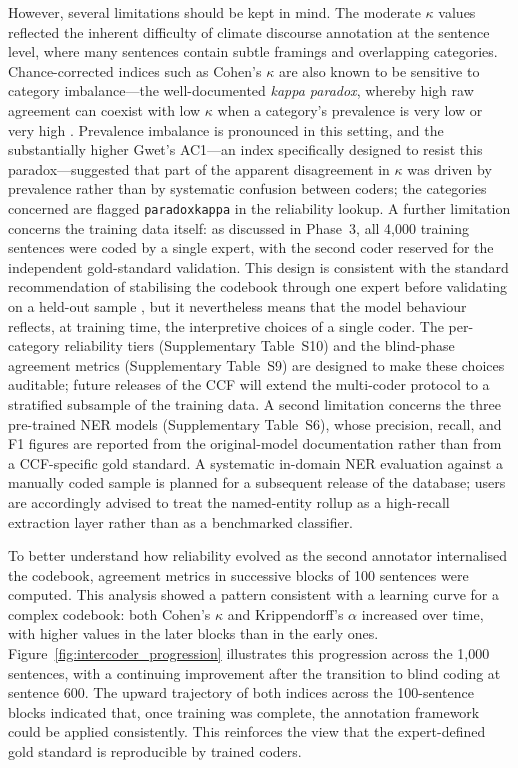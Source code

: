 \documentclass[12pt]{article}
\renewcommand\_{\texttt{\detokenize{_}\allowbreak}}
\begin{document}
However, several limitations should be kept in mind. The moderate $\kappa$ values reflected the inherent difficulty of climate discourse annotation at the sentence level, where many sentences contain subtle framings and overlapping categories. Chance-corrected indices such as Cohen's $\kappa$ are also known to be sensitive to category imbalance---the well-documented \emph{kappa paradox}, whereby high raw agreement can coexist with low $\kappa$ when a category's prevalence is very low or very high \autocite{feinstein_high_1990, byrt_bias_1993}. Prevalence imbalance is pronounced in this setting, and the substantially higher Gwet's AC1---an index specifically designed to resist this paradox---suggested that part of the apparent disagreement in $\kappa$ was driven by prevalence rather than by systematic confusion between coders; the categories concerned are flagged \texttt{paradox\_kappa} in the reliability lookup. A further limitation concerns the training data itself: as discussed in Phase~3, all 4,000 training sentences were coded by a single expert, with the second coder reserved for the independent gold-standard validation. This design is consistent with the standard recommendation of stabilising the codebook through one expert before validating on a held-out sample \autocite{krippendorff_content_2019}, but it nevertheless means that the model behaviour reflects, at training time, the interpretive choices of a single coder. The per-category reliability tiers (Supplementary Table~S10) and the blind-phase agreement metrics (Supplementary Table~S9) are designed to make these choices auditable; future releases of the CCF will extend the multi-coder protocol to a stratified subsample of the training data. A second limitation concerns the three pre-trained NER models (Supplementary Table~S6), whose precision, recall, and F1 figures are reported from the original-model documentation rather than from a CCF-specific gold standard. A systematic in-domain NER evaluation against a manually coded sample is planned for a subsequent release of the database; users are accordingly advised to treat the named-entity rollup as a high-recall extraction layer rather than as a benchmarked classifier.

To better understand how reliability evolved as the second annotator internalised the codebook, agreement metrics in successive blocks of 100 sentences were computed. This analysis showed a pattern consistent with a learning curve for a complex codebook: both Cohen's $\kappa$ and Krippendorff's $\alpha$ increased over time, with higher values in the later blocks than in the early ones. Figure~\ref{fig:intercoder_progression} illustrates this progression across the 1,000 sentences, with a continuing improvement after the transition to blind coding at sentence 600. The upward trajectory of both indices across the 100-sentence blocks indicated that, once training was complete, the annotation framework could be applied consistently. This reinforces the view that the expert-defined gold standard is reproducible by trained coders.
\end{document}
